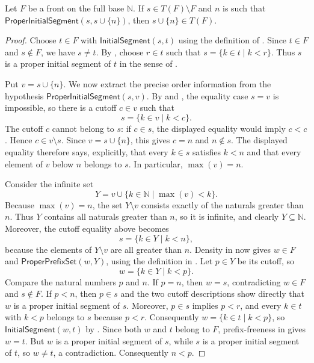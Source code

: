 \begin{lemma}
Let $F$ be a front on the full base $\mathbb N$.  If
$s\in T(F)\setminus F$ and $n$ is such that
$\mathsf{ProperInitialSegment}(s,s\cup\{n\})$, then
$s\cup\{n\}\in T(F)$.
\end{lemma}
\begin{proof}
Choose $t\in F$ with $\mathsf{InitialSegment}(s,t)$ using the definition of
.  Since $t\in F$ and $s\notin F$, we have $s\ne t$.
By , choose $r\in t$ such that
$s=\{k\in t\mid k<r\}$.  Thus $s$ is a proper initial segment of $t$ in
the sense of .

Put $v=s\cup\{n\}$.  We now extract the precise order information from
the hypothesis $\mathsf{ProperInitialSegment}(s,v)$.  By
 and , the equality
case $s=v$ is impossible, so there is a cutoff $c\in v$ such that
\[
  s=\{k\in v\mid k<c\}.
\]
The cutoff $c$ cannot belong to $s$: if $c\in s$, the displayed equality
would imply $c<c$.  Hence $c\in v\setminus s$.  Since
$v=s\cup\{n\}$, this gives $c=n$ and $n\notin s$.  The displayed equality
therefore says, explicitly, that every $k\in s$ satisfies $k<n$ and that
every element of $v$ below $n$ belongs to $s$.
In particular, $\max(v)=n$.

Consider the infinite set
\[
  Y=v\cup\{k\in\mathbb N\mid \max(v)<k\}.
\]
Because $\max(v)=n$, the set $Y\setminus v$ consists exactly of the
naturals greater than $n$.  Thus $Y$ contains all naturals greater than
$n$, so it is infinite, and clearly $Y\subseteq\mathbb N$.  Moreover, the
cutoff equality above becomes
\[
  s=\{k\in Y\mid k<n\},
\]
because the elements of $Y\setminus v$ are all greater than $n$.  Density
in  now gives $w\in F$ and
$\mathsf{ProperPrefixSet}(w,Y)$, using the definition in
.  Let $p\in Y$ be its cutoff, so
\[
  w=\{k\in Y\mid k<p\}.
\]
Compare the natural numbers $p$ and $n$.
If $p=n$, then $w=s$, contradicting $w\in F$ and $s\notin F$.  If
$p<n$, then $p\in s$ and the two cutoff descriptions show directly that
$w$ is a proper initial segment of $s$.  Moreover, $p\in s$ implies
$p<r$, and every $k\in t$ with $k<p$ belongs to $s$ because $p<r$.
Consequently
$w=\{k\in t\mid k<p\}$, so $\mathsf{InitialSegment}(w,t)$ by
.  Since both $w$ and $t$ belong to $F$,
prefix-freeness in  gives $w=t$.  But $w$ is a proper
initial segment of $s$, while $s$ is a proper initial segment of $t$, so
$w\ne t$, a contradiction.  Consequently $n<p$.


\end{proof}
